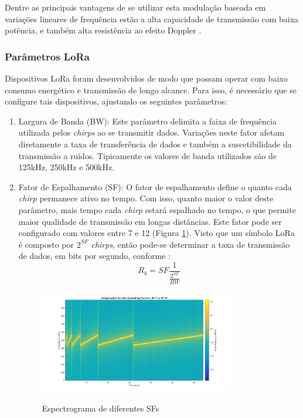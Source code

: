 \documentclass[oneside,openright,12pt]{ufsm_2015} %
\begin{document}
Dentre as principais vantagens de se utilizar esta modulação baseada em variações lineares de frequência estão a alta capacidade de transmissão com baixa potência, e também alta resistência ao efeito Doppler \cite{augustin2016study}.

\subsubsection{Parâmetros LoRa}
Dispositivos LoRa foram desenvolvidos de modo que possam operar com baixo consumo energético e transmissão de longo alcance. Para isso, é necessário que se configure tais dispositivos, ajustando os seguintes parâmetros:

\begin{enumerate}
    \item Largura de Banda (BW): Este parâmetro delimita a faixa de frequência utilizada pelos \textit{chirps} ao se transmitir dados. Variações neste fator afetam diretamente a taxa de transferência de dados e também a suscetibilidade da transmissão a ruídos. Tipicamente os valores de banda utilizados são de 125kHz, 250kHz e 500kHz.
    
    \item Fator de Espalhamento (SF): O fator de espalhamento define o quanto cada \textit{chirp} permanece ativo no tempo. Com isso, quanto maior o valor deste parâmetro, mais tempo cada \textit{chirp} estará espalhado no tempo, o que permite maior qualidade de transmissão em longas distâncias. Este fator pode ser configurado com valores entre 7 e 12 (Figura \ref{fig:lora-sf}). Visto que um símbolo LoRa é composto por $2^{SF}$ \textit{chirps}, então pode-se determinar a taxa de transmissão de dados, em bits por segundo, conforme \cite{lora-modulation-basics}:
    \begin{equation}
        R_b = SF\frac{1}{\frac{2^{SF}}{BW}}
    \end{equation}
    
    \begin{figure}[ht]
    \caption{\label{exepretex} Espectrograma de diferentes SFs}
    \centering
    \includegraphics[width=0.8\textwidth]{figuras/lora-sf.png}
    \vspace{\baselineskip} %
        \label{fig:lora-sf}
    

\end{figure}
\end{enumerate}
\end{document}
